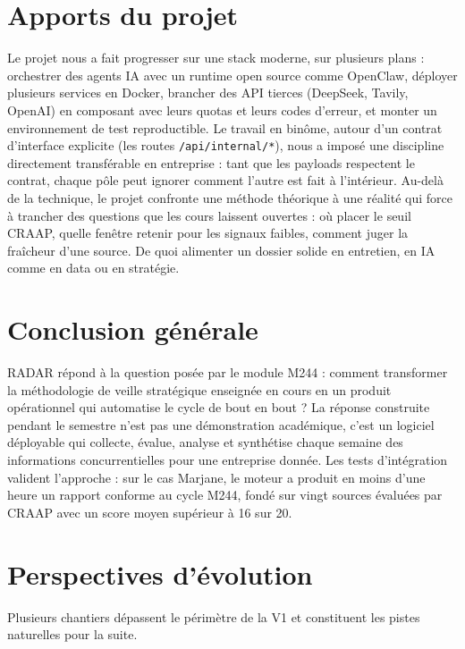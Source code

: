 \documentclass[12pt,a4paper,openany]{report}
\begin{document}
\section{Apports du projet}
\label{sec:apports}

Le projet nous a fait progresser sur une stack moderne, sur plusieurs plans : orchestrer des agents IA avec un runtime open source comme OpenClaw, déployer plusieurs services en Docker, brancher des API tierces (DeepSeek, Tavily, OpenAI) en composant avec leurs quotas et leurs codes d'erreur, et monter un environnement de test reproductible. Le travail en binôme, autour d'un contrat d'interface explicite (les routes \texttt{/api/internal/*}), nous a imposé une discipline directement transférable en entreprise : tant que les payloads respectent le contrat, chaque pôle peut ignorer comment l'autre est fait à l'intérieur. Au-delà de la technique, le projet confronte une méthode théorique à une réalité qui force à trancher des questions que les cours laissent ouvertes : où placer le seuil CRAAP, quelle fenêtre retenir pour les signaux faibles, comment juger la fraîcheur d'une source. De quoi alimenter un dossier solide en entretien, en IA comme en data ou en stratégie.

\section{Conclusion générale}
\label{sec:conclusion-generale}

RADAR répond à la question posée par le module M244 : comment transformer la méthodologie de veille stratégique enseignée en cours en un produit opérationnel qui automatise le cycle de bout en bout ? La réponse construite pendant le semestre n'est pas une démonstration académique, c'est un logiciel déployable qui collecte, évalue, analyse et synthétise chaque semaine des informations concurrentielles pour une entreprise donnée. Les tests d'intégration valident l'approche : sur le cas Marjane, le moteur a produit en moins d'une heure un rapport conforme au cycle M244, fondé sur vingt sources évaluées par CRAAP avec un score moyen supérieur à 16 sur 20.

\section{Perspectives d'évolution}
\label{sec:perspectives}

Plusieurs chantiers dépassent le périmètre de la V1 et constituent les pistes naturelles pour la suite.
\end{document}
